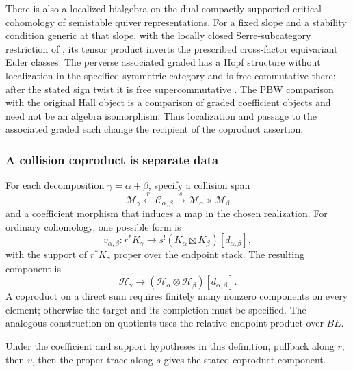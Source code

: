 There is also a localized bialgebra on the dual compactly
supported critical cohomology of semistable quiver
representations. For a fixed slope and a stability condition
generic at that slope, with the locally closed Serre-subcategory restriction
of \cite[\S6.1]{DavisonMeinhardtCoHA}, its tensor product
inverts the prescribed cross-factor equivariant Euler classes.
The perverse associated graded has a Hopf structure without
localization in the specified symmetric category and is free commutative
there; after the stated sign twist it is free supercommutative
\cite[Theorem~C]{DavisonMeinhardtCoHA}. The PBW comparison
with the original Hall object is a comparison of graded
coefficient objects and need not be an algebra isomorphism.
Thus localization and passage to the associated graded each
change the recipient of the coproduct assertion.

\subsubsection*{A collision coproduct is separate data}

\begin{definition}
\label{def:collision-coproduct}
\label{def:compact-hall-coproduct}
For each decomposition $\gamma=\alpha+\beta$, specify a
collision span
\[
 \mathcal M_\gamma\xleftarrow{\ r\ }
 \mathcal C_{\alpha,\beta}\xrightarrow{\ s\ }
 \mathcal M_\alpha\times\mathcal M_\beta
\]
and a coefficient morphism that induces a map in the chosen
realization. For ordinary cohomology, one possible form is
\[
 v_{\alpha,\beta}:r^*K_\gamma
 \longrightarrow s^!(K_\alpha\boxtimes K_\beta)[d_{\alpha,\beta}],
\]
with the support of $r^*K_\gamma$ proper over the endpoint
stack. The resulting component is
\[
 \mathcal H_\gamma\longrightarrow
 (\mathcal H_\alpha\otimes\mathcal H_\beta)[d_{\alpha,\beta}].
\]
A coproduct on a direct sum requires finitely many nonzero
components on every element; otherwise the target and its
completion must be specified. The analogous construction on
quotients uses the relative endpoint product over $BE$.
\end{definition}

\begin{proposition}
\label{prop:finite-hall-coproduct-pushforward-existence}
Under the coefficient and support hypotheses in this definition,
pullback along $r$, then $v$, then the proper trace along $s$
gives the stated coproduct component.
\end{proposition}

